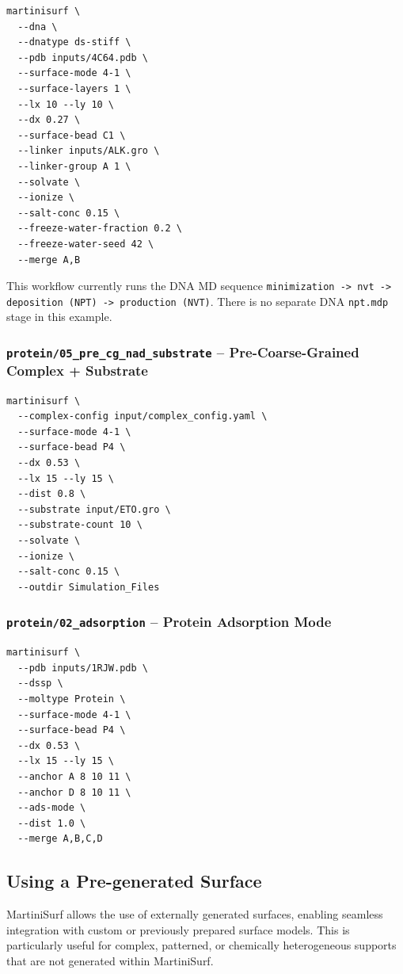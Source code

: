 \documentclass[11pt]{article}
\begin{document}
\begin{lstlisting}
martinisurf \
  --dna \
  --dnatype ds-stiff \
  --pdb inputs/4C64.pdb \
  --surface-mode 4-1 \
  --surface-layers 1 \
  --lx 10 --ly 10 \
  --dx 0.27 \
  --surface-bead C1 \
  --linker inputs/ALK.gro \
  --linker-group A 1 \
  --solvate \
  --ionize \
  --salt-conc 0.15 \
  --freeze-water-fraction 0.2 \
  --freeze-water-seed 42 \
  --merge A,B
\end{lstlisting}

This workflow currently runs the DNA MD sequence
\texttt{minimization -> nvt -> deposition (NPT) -> production (NVT)}.
There is no separate DNA \texttt{npt.mdp} stage in this example.

\subsubsection*{\texttt{protein/05\_pre\_cg\_nad\_substrate} -- Pre-Coarse-Grained Complex + Substrate}

\begin{lstlisting}
martinisurf \
  --complex-config input/complex_config.yaml \
  --surface-mode 4-1 \
  --surface-bead P4 \
  --dx 0.53 \
  --lx 15 --ly 15 \
  --dist 0.8 \
  --substrate input/ETO.gro \
  --substrate-count 10 \
  --solvate \
  --ionize \
  --salt-conc 0.15 \
  --outdir Simulation_Files
\end{lstlisting}

\subsubsection*{\texttt{protein/02\_adsorption} -- Protein Adsorption Mode}

\begin{lstlisting}
martinisurf \
  --pdb inputs/1RJW.pdb \
  --dssp \
  --moltype Protein \
  --surface-mode 4-1 \
  --surface-bead P4 \
  --dx 0.53 \
  --lx 15 --ly 15 \
  --anchor A 8 10 11 \
  --anchor D 8 10 11 \
  --ads-mode \
  --dist 1.0 \
  --merge A,B,C,D
\end{lstlisting}

\subsection{Using a Pre-generated Surface}

MartiniSurf allows the use of externally generated surfaces, enabling seamless
integration with custom or previously prepared surface models.
This is particularly useful for complex, patterned, or chemically heterogeneous
supports that are not generated within MartiniSurf.
\end{document}
